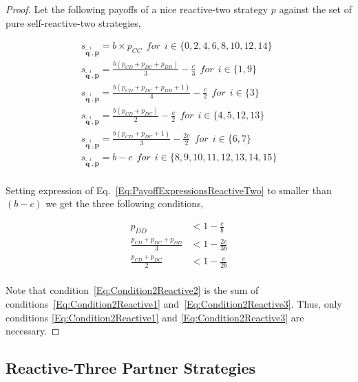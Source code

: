 \documentclass{article}
\theoremstyle{definition}
\begin{document}
\begin{proof}
Let the following payoffs of a nice reactive-two strategy $p$ against
the set of pure self-reactive-two strategies,

\begin{equation}\label{Eq:PayoffExpressionsReactiveTwo}
  \begin{array}{l}
    s_{\mathbf{\tilde{q}}^{i}, \mathbf{p}} = b \times p_{CC} ~~for~~ i \in \{0, 2, 4, 6, 8, 10, 12, 14\} \\ [1em]
    s_{\mathbf{\tilde{q}}^{i}, \mathbf{p}} = \frac{b (p_{CD} + p_{DC} + p_{DD})}{3} - \frac{c}{3} ~~for~~ i \in \{1, 9\} \\ [1em]
    s_{\mathbf{\tilde{q}}^{i}, \mathbf{p}} = \frac{b (p_{CD} + p_{DC} + p_{DD} + 1)}{4} - \frac{c}{2} ~~for~~ i \in \{3\} \\ [1em]
    s_{\mathbf{\tilde{q}}^{i}, \mathbf{p}} = \frac{b (p_{CD} + p_{DC})}{2} - \frac{c}{2} ~~for~~ i \in \{4, 5, 12, 13\} \\ [1em]
    s_{\mathbf{\tilde{q}}^{i}, \mathbf{p}} = \frac{b (p_{CD} + p_{DC} + 1)}{3} - \frac{2c}{2} ~~for~~ i \in \{6, 7\}\\ [1em]
    s_{\mathbf{\tilde{q}}^{i}, \mathbf{p}} = b - c ~~for~~ i \in \{8, 9, 10, 11, 12, 13, 14, 15\}\\
  \end{array}
\end{equation}

Setting expression of Eq.~\eqref{Eq:PayoffExpressionsReactiveTwo} to smaller than
$(b - c)$ we get the three following conditions,

\begin{align} 
  p_{DD} & < 1 - \frac{c}{b} \\ \label{Eq:Condition2Reactive1}
  \frac{p_{CD} + p_{DC} + p_{DD}}{3} & < 1 - \frac{2c}{3b} \\ \label{Eq:Condition2Reactive2}
  \frac{p_{CD} + p_{DC}}{2} & < 1 - \frac{c}{2b} \\ \label{Eq:Condition2Reactive3}
\end{align}

Note that condition~\eqref{Eq:Condition2Reactive2} is the sum of
conditions~\eqref{Eq:Condition2Reactive1} and~\eqref{Eq:Condition2Reactive3}.
Thus, only conditions \eqref{Eq:Condition2Reactive1} and \eqref{Eq:Condition2Reactive3}
are necessary.
\end{proof}

\subsection{Reactive-Three Partner Strategies}
\end{document}
